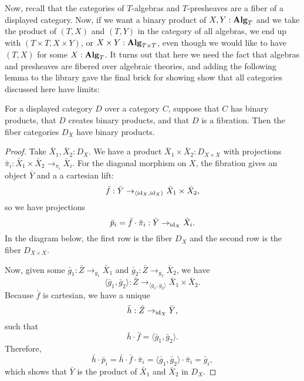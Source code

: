 Now, recall that the categories of $ T $-algebras and $ T $-presheaves are a fiber of a displayed category. Now, if we want a binary product of $ X, Y : \mathbf{Alg}_{T} $ and we take the product of $ (T, X) $ and $ (T, Y) $ in the category of all algebras, we end up with $ (T \times T, X \times Y) $, or $ X \times Y : \mathbf{Alg}_{T \times T} $, even though we would like to have $ (T, X) $ for some $ X : \mathbf{Alg}_{T} $. It turns out that here we need the fact that algebras and presheaves are fibered over algebraic theories, and adding the following lemma to the library gave the final brick for showing show that all categories discussed here have limits:
\begin{lemma}
  For a displayed category $ D $ over a category $ C $, suppose that $ C $ has binary products, that $ D $ creates binary products, and that $ D $ is a fibration. Then the fiber categories $ D_X $ have binary products.
\end{lemma}
\begin{proof}
  Take $ \bar X_1, \bar X_2 : D_X $. We have a product $ \bar X_1 \times \bar X_2 : D_{X \times X} $ with projections $ \bar \pi_i : \bar X_1 \times \bar X_2 \to_{\pi_i} \bar X_i $. For the diagonal morphism on $ X $, the fibration gives an object $ \bar Y $ and a a cartesian lift:
  \[ \bar f : \bar Y \to_{\langle \text{id}_{X}, \text{id}_{X} \rangle} \bar X_1 \times \bar X_2, \]
  so we have projections
  \[ \bar p_i = \bar f \cdot \bar \pi_i : \bar Y \to_{\text{id}_{X}} \bar X_i. \]
  In the diagram below, the first row is the fiber $ D_X $ and the second row is the fiber $ D_{X \times X} $.
  \begin{center}
  \end{center}
  Now, given some $ \bar g_1: \bar Z \to_{g_1} \bar X_1 $ and $ \bar g_2: \bar Z \to_{g_2} \bar X_2 $, we have
  \[ \langle \bar g_1, \bar g_2 \rangle : \bar Z \to_{\langle g_1, g_2 \rangle} \bar X_1 \times \bar X_2. \]
  Because $ \bar f $ is cartesian, we have a unique
  \[ \bar h: \bar Z \to_{\text{id}_{X}} \bar Y, \]
  such that
  \[ \bar h \cdot \bar f = \langle \bar g_1, \bar g_2 \rangle. \]
  Therefore,
  \[ \bar h \cdot \bar p_i = \bar h \cdot \bar f \cdot \bar \pi_i = \langle \bar g_1, \bar g_2 \rangle \cdot \bar \pi_i = \bar g_i, \]
  which shows that $ \bar Y $ is the product of $ \bar X_1 $ and $ \bar X_2 $ in $ D_X $.
\end{proof}

